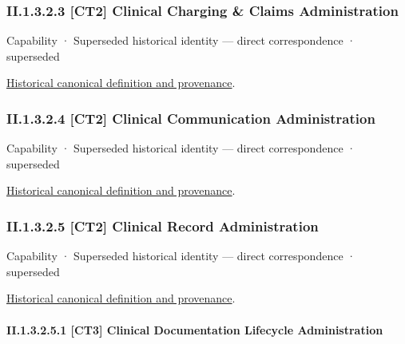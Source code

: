 \subsubsection*{II.1.3.2.3 [CT2] Clinical Charging \& Claims Administration}
\label{navigation:II.1.3.2.3}

\label{element:44433108cc8f4f5f9d7581f9e5b29eb5}
{\small Capability · Superseded historical identity — direct correspondence · superseded}\par
\href{../../../../continuum/strategy/capability/44433108cc8f4f5f9d7581f9e5b29eb5.md}{Historical canonical definition and provenance}.\par
\subsubsection*{II.1.3.2.4 [CT2] Clinical Communication Administration}
\label{navigation:II.1.3.2.4}

\label{element:bd4d6f4a7f03402ba7857383c7be7a4c}
{\small Capability · Superseded historical identity — direct correspondence · superseded}\par
\href{../../../../continuum/strategy/capability/bd4d6f4a7f03402ba7857383c7be7a4c.md}{Historical canonical definition and provenance}.\par
\subsubsection*{II.1.3.2.5 [CT2] Clinical Record Administration}
\label{navigation:II.1.3.2.5}

\label{element:be3f2e695eda403fbce8118daf83d386}
{\small Capability · Superseded historical identity — direct correspondence · superseded}\par
\href{../../../../continuum/strategy/capability/be3f2e695eda403fbce8118daf83d386.md}{Historical canonical definition and provenance}.\par
\paragraph*{II.1.3.2.5.1 [CT3] Clinical Documentation Lifecycle Administration}
\label{navigation:II.1.3.2.5.1}

